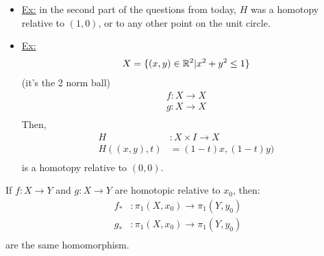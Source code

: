 \documentclass[../notes.tex]{subfiles}
\begin{document}
    \begin{itemize}
        \item \underline{Ex:} in the second part of the questions from today, $H$ was a homotopy relative to $(1,0)$, or
            to any other point on the unit circle.
        \item \underline{Ex:}
            \begin{align*}
                X=\{(x,y)\in \mathbb{R}^2 | x^2+y^2\leq 1\}\\
            \end{align*}
            (it's the 2 norm ball)
            \begin{align*}
                f: X\rightarrow X\\
                g: X\rightarrow X\\
            \end{align*}
            Then,
            \begin{align*}
                H&: X\times I \rightarrow X\\
                H((x,y),t)&=(1-t)x, (1-t)y)\\
            \end{align*}
            is a homotopy relative to $(0,0)$.
    \end{itemize}
        \begin{theorem} If $f:X\rightarrow Y$ and $g:X\rightarrow Y$ are
            homotopic relative to $x_0$, then:
                \begin{align*}
                    f_{*}&:\pi_1(X,x_0)\rightarrow \pi_1(Y,y_0)\\
                    g_{*}&:\pi_1(X,x_0)\rightarrow \pi_1(Y,y_0)\\
                \end{align*}
                are the same homomorphism.
        \end{theorem}
\end{document}
